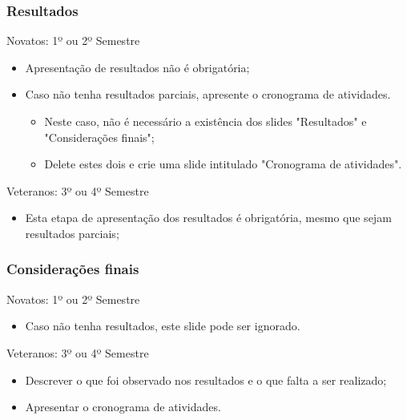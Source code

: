 \documentclass[aspectratio=169]{beamer}
\begin{document}
\begin{frame}
\frametitle{Resultados}

\begin{block}{Novatos: 1º ou 2º Semestre}
    \begin{itemize}
        \item Apresentação de resultados não é obrigatória; 
        \item Caso não tenha resultados parciais, apresente o cronograma de atividades.
        \begin{itemize}
            \item Neste caso, não é necessário a existência dos slides "Resultados" e "Considerações finais";
            \item Delete estes dois e crie uma slide intitulado "Cronograma de atividades".
        \end{itemize}
    \end{itemize}
\end{block}

\begin{block}{Veteranos: 3º ou 4º Semestre}
    \begin{itemize}
        \item Esta etapa de apresentação dos resultados é obrigatória, mesmo que sejam resultados parciais;
    \end{itemize}
\end{block}

\end{frame}

\begin{frame}
\frametitle{Considerações finais}

\begin{block}{Novatos: 1º ou 2º Semestre}
    \begin{itemize}
        \item Caso não tenha resultados, este slide pode ser ignorado.
    \end{itemize}
\end{block}

\begin{block}{Veteranos: 3º ou 4º Semestre}
    \begin{itemize}
        \item Descrever o que foi observado nos resultados e o que falta a ser realizado;
        \item Apresentar o cronograma de atividades.
    \end{itemize}
\end{block}

\end{frame}
\end{document}
